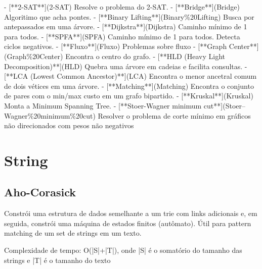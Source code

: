 \documentclass[11pt, a4paper, twoside]{article}
\begin{document}
- [**2-SAT**](2-SAT)  
  Resolve o problema do 2-SAT.
- [**Bridge**](Bridge)  
  Algoritimo que acha pontes.
- [**Binary Lifting**](Binary\%20Lifting)  
  Busca por antepassados em uma árvore.
- [**Dijkstra**](Dijkstra)  
  Caminho mínimo de 1 para todos.
- [**SPFA**](SPFA)  
  Caminho mínimo de 1 para todos. Detecta ciclos negativos.
- [**Fluxo**](Fluxo)  
  Problemas sobre fluxo
- [**Graph Center**](Graph\%20Center)  
  Encontra o centro do grafo.
- [**HLD (Heavy Light Decomposition)**](HLD)  
  Quebra uma árvore em cadeias e facilita consultas.
- [**LCA (Lowest Common Ancestor)**](LCA)  
  Encontra o menor ancetral comum de dois vétices em uma árvore.
- [**Matching**](Matching)  
  Encontra o conjunto de pares com o min/max custo em um grafo bipartido.
- [**Kruskal**](Kruskal)  
  Monta a Minimum Spanning Tree.
- [**Stoer-Wagner minimum cut**](Stoer–Wagner\%20minimum\%20cut)  
  Resolver o problema de corte mínimo em gráficos não direcionados com pesos não negativos

\newpage
%
%
%
%

\section{String}

\subsection{Aho-Corasick}


Constrói uma estrutura de dados semelhante a um trie com links adicionais e, em seguida, constrói uma máquina de estados finitos (autômato). Útil para pattern matching de um set de strings em um texto.

Complexidade de tempo: O(|S|+|T|), onde |S| é o somatório do tamanho das strings e |T| é o tamanho do texto
\end{document}
